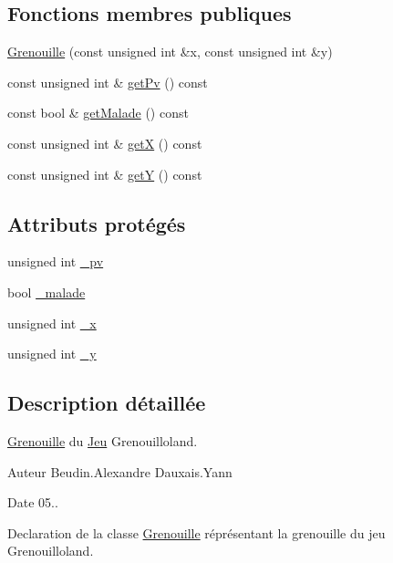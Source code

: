 \subsection*{Fonctions membres publiques}
\begin{DoxyCompactItemize}
\item 
\hyperlink{classgrenouilloland_1_1Grenouille_a326ab4ac092c17f75bae7f966c991f21}{Grenouille} (const unsigned int \&x, const unsigned int \&y)
\item 
const unsigned int \& \hyperlink{classgrenouilloland_1_1Grenouille_afc9b3a8e9454d5172b0f6c7919c39096}{get\-Pv} () const 
\item 
const bool \& \hyperlink{classgrenouilloland_1_1Grenouille_a34a9cbbdbd8ba170c1e417315ef220ca}{get\-Malade} () const 
\item 
const unsigned int \& \hyperlink{classgrenouilloland_1_1Grenouille_ad1e7306d8f1bd838d5d37ec215c1ca38}{get\-X} () const 
\item 
const unsigned int \& \hyperlink{classgrenouilloland_1_1Grenouille_a3110e6b856e7fe92113749c5ee3eb8f1}{get\-Y} () const 
\end{DoxyCompactItemize}
\subsection*{Attributs protégés}
\begin{DoxyCompactItemize}
\item 
unsigned int \hyperlink{classgrenouilloland_1_1Grenouille_a8dc2111b41b87f2c751405841dd73604}{\-\_\-pv}
\item 
bool \hyperlink{classgrenouilloland_1_1Grenouille_a0fbd566d479f7c5b2968606948869b42}{\-\_\-malade}
\item 
unsigned int \hyperlink{classgrenouilloland_1_1Grenouille_ac058265e4d19df895f88d2c485a62eee}{\-\_\-x}
\item 
unsigned int \hyperlink{classgrenouilloland_1_1Grenouille_accbac66bf92efeca1135682eb24c99e7}{\-\_\-y}
\end{DoxyCompactItemize}


\subsection{Description détaillée}
\hyperlink{classgrenouilloland_1_1Grenouille}{Grenouille} du \hyperlink{classgrenouilloland_1_1Jeu}{Jeu} Grenouilloland. 

\begin{DoxyAuthor}{Auteur}
Beudin.\-Alexandre Dauxais.\-Yann 
\end{DoxyAuthor}
\begin{DoxyDate}{Date}
05..
\end{DoxyDate}
Declaration de la classe \hyperlink{classgrenouilloland_1_1Grenouille}{Grenouille} réprésentant la grenouille du jeu Grenouilloland. 

